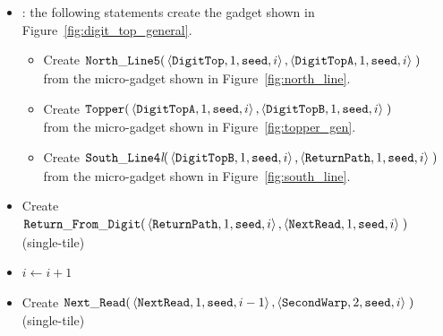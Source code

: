 \begin{itemize}
    \item {\dtop}: the following statements create the gadget shown in Figure~\ref{fig:digit_top_general}.
    \begin{itemize}
        \item Create
        $\begin{aligned}[t]
            {\tt North\_Line5}(& \left \langle {\tt DigitTop},  1, {\tt seed}, i \right\rangle,
                                 \left \langle {\tt DigitTopA}, 1, {\tt seed}, i \right\rangle \;)
        \end{aligned}$\\ from the micro-gadget shown in Figure~\ref{fig:north_line}.

        \item Create
        $\begin{aligned}[t]
            {\tt Topper}(& \left\langle {\tt DigitTopA}, 1, {\tt seed}, i \right\rangle,
                           \left\langle {\tt DigitTopB}, 1, {\tt seed}, i \right\rangle \;)
        \end{aligned}$\\ from the micro-gadget shown in Figure~\ref{fig:topper_gen}.

        \item Create
        $\begin{aligned}[t]
            {\tt South\_Line4\textit{l}}(& \left\langle {\tt DigitTopB}, 1, {\tt seed}, i\right\rangle,
                                           \left\langle {\tt ReturnPath},     1, {\tt seed}, i\right\rangle \;)
        \end{aligned}$\\ from the micro-gadget shown in Figure~\ref{fig:south_line}.
    \end{itemize}

    \item Create
    $\begin{aligned}[t]
            {\tt Return\_From\_Digit}(&\left\langle {\tt ReturnPath},    1, {\tt seed}, i \right\rangle,
                              \left\langle {\tt NextRead}, 1, {\tt seed}, i \right\rangle \;)
    \end{aligned}$\\ (single-tile)

    \item $i \gets i + 1$

    \item Create
    $\begin{aligned}[t]
            {\tt Next\_Read}(&\left\langle {\tt NextRead},   1, {\tt seed}, i - 1\right\rangle,
                       \left\langle {\tt SecondWarp}, 2, {\tt seed}, i    \right\rangle \;)
    \end{aligned}$\\ (single-tile)


\end{itemize}
